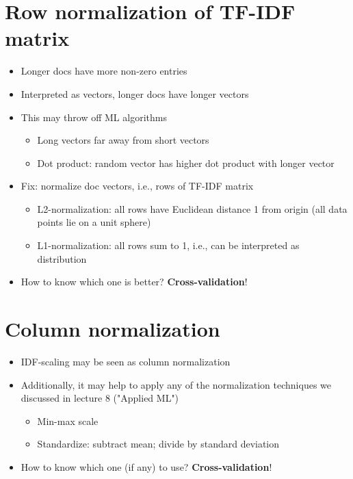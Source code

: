 \documentclass[11pt]{article}
\begin{document}
\section*{Row normalization of TF-IDF matrix}
\begin{itemize}
	\item Longer docs have more non-zero entries
	\item Interpreted as vectors, longer docs have longer vectors
	\item This may throw off ML algorithms
		\begin{itemize}
			\item Long vectors far away from short vectors
			\item Dot product: random vector has higher dot product with longer vector
		\end{itemize}
	\item Fix: normalize doc vectors, i.e., rows of TF-IDF matrix
		\begin{itemize}
			\item L2-normalization: all rows have Euclidean distance 1 from origin (all data points lie on a unit sphere)
			\item L1-normalization: all rows sum to 1, i.e., can be interpreted as distribution
		\end{itemize}
	\item How to know which one is better? \textbf{Cross-validation}!
\end{itemize}

\section*{Column normalization}
\begin{itemize}
	\item IDF-scaling may be seen as column normalization
	\item Additionally, it may help to apply any of the normalization techniques we discussed in lecture 8 ("Applied ML")
		\begin{itemize}
			\item Min-max scale
			\item Standardize: subtract mean; divide by standard deviation
		\end{itemize}
	\item How to know which one (if any) to use? \textbf{Cross-validation}!
\end{itemize}
\end{document}

